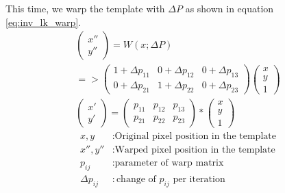 \documentclass[11pt,a4paper,titlepage,oneside]{report}
\begin{document}
This time, we warp the template with $\Delta P$ as shown in equation \ref{eq:inv_lk_warp}. 
\begin{equation}\label{eq:inv_lk_warp}
  \begin{gathered}
    \begin{pmatrix}
      x'' \\
      y''
    \end{pmatrix}=
    W(x;\Delta P)\\
    =>\begin{pmatrix}
      1 + \Delta p_{11} & 0 + \Delta p_{12} & 0 + \Delta p_{13} \\
      0 + \Delta p_{21} & 1 + \Delta p_{22} & 0 + \Delta p_{23}
    \end{pmatrix}
    \begin{pmatrix}
      x\\
      y\\
      1
    \end{pmatrix}\\
    \begin{pmatrix}
      x' \\
      y'
    \end{pmatrix}=
    \begin{pmatrix}
      p_{11} & p_{12} & p_{13} \\
      p_{21} & p_{22} & p_{23}
    \end{pmatrix}*
    \begin{pmatrix}
      x\\
      y\\
      1
    \end{pmatrix}
  \end{gathered}
\end{equation}
\begin{align*}
  x,y            &: \text{Original pixel position in the template}\\
  x'',y''        &: \text{Warped pixel position in the template}\\
  p_{ij}         &: \text{parameter of warp matrix}\\
  \Delta p_{ij}  &: \text{change of $p_{ij}$ per iteration}
\end{align*}
\end{document}
